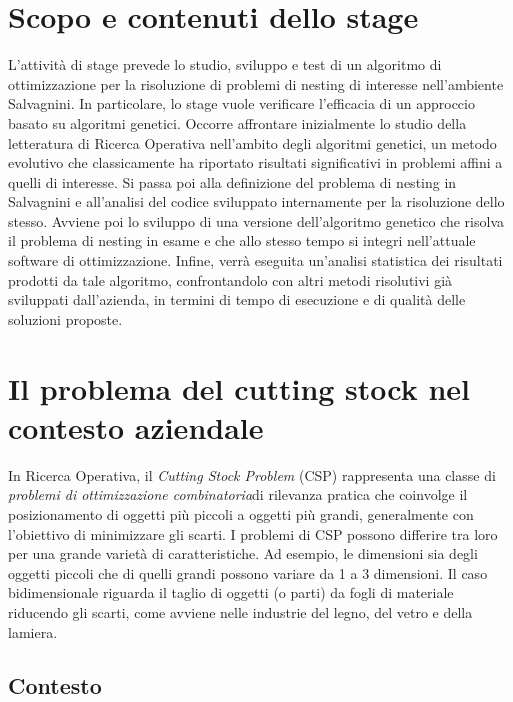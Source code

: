 \section{Scopo e contenuti dello stage}

L’attività di stage prevede lo studio, sviluppo e test di un algoritmo di ottimizzazione per la risoluzione di problemi di nesting di interesse nell’ambiente Salvagnini. In particolare, lo stage vuole verificare l'efficacia di un approccio basato su algoritmi genetici.
Occorre affrontare inizialmente lo studio della letteratura di Ricerca Operativa nell’ambito degli algoritmi genetici, un metodo evolutivo che classicamente ha riportato risultati significativi in problemi affini a quelli di interesse. Si passa poi alla definizione del problema di nesting in Salvagnini e all’analisi del codice sviluppato internamente per la risoluzione dello stesso. Avviene poi lo sviluppo di una versione dell’algoritmo genetico che risolva il problema di nesting in esame e che allo stesso tempo si integri nell’attuale software di ottimizzazione. Infine, verrà eseguita un’analisi statistica dei risultati prodotti da tale algoritmo, confrontandolo con altri metodi risolutivi già sviluppati dall’azienda, in termini di tempo di esecuzione e di qualità delle soluzioni proposte.

\section{Il problema del cutting stock nel contesto aziendale}

In Ricerca Operativa, il \emph{Cutting Stock Problem} (CSP) rappresenta una classe di \emph{problemi di ottimizzazione combinatoria}\glsfirstoccur di rilevanza pratica che coinvolge il posizionamento di oggetti più piccoli a oggetti più grandi, generalmente con l'obiettivo di minimizzare gli scarti. I problemi di CSP possono differire tra loro per una grande varietà di caratteristiche. Ad esempio, le dimensioni sia degli oggetti piccoli che di quelli grandi possono variare da 1 a 3 dimensioni. Il caso bidimensionale riguarda il taglio di oggetti (o parti) da fogli di materiale riducendo gli scarti, come avviene nelle industrie del legno, del vetro e della lamiera.

\subsection{Contesto}

